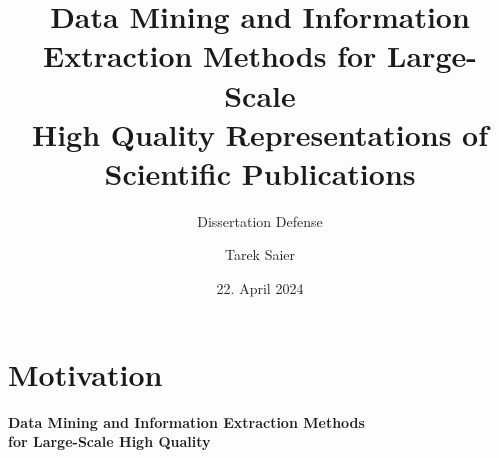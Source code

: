 \documentclass[en,16:9,smallfoot]{sdqbeamer}
\title[Data Mining and Information Extraction Methods for Large-Scale High Quality Representations of Scientific Publications]{Data Mining and Information Extraction Methods for Large-Scale\\High Quality Representations of Scientific Publications}
\subtitle{Dissertation Defense}
\author{Tarek Saier}
\date[22.\,04.\,2024]{22. April 2024}
\begin{document}
\KITtitleframe


\section{Motivation}




   \begin{frame}[plain]
        \vspace{1cm}
        \centering
        \begin{Large}
        {\color{lightgrey}\textbf{Data Mining and Information Extraction Methods}}\\
        \vspace{0.25em}
        {\color{lightgrey}\textbf{for Large-Scale High Quality}}\\
        \vspace{0.5em}
        {\textbf{
        }}
        \end{Large}
   \end{frame}
\end{document}
